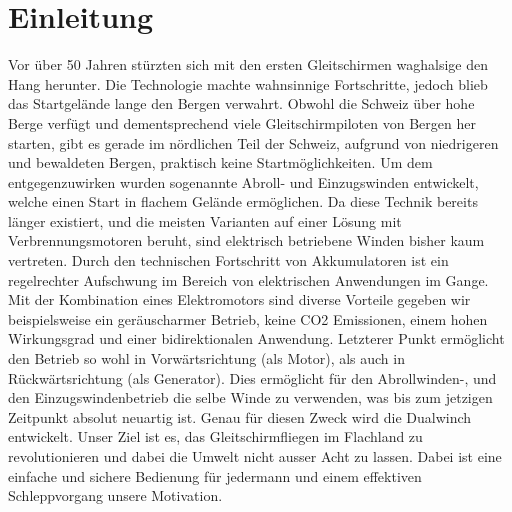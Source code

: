 \section{Einleitung}
Vor über 50 Jahren stürzten sich mit den ersten Gleitschirmen waghalsige den Hang herunter. Die Technologie machte wahnsinnige Fortschritte, jedoch blieb das Startgelände lange den Bergen verwahrt. Obwohl die Schweiz über hohe Berge verfügt und dementsprechend viele Gleitschirmpiloten von Bergen her starten, gibt es gerade im nördlichen Teil der Schweiz, aufgrund von niedrigeren und bewaldeten Bergen, praktisch keine Startmöglichkeiten. Um dem entgegenzuwirken wurden sogenannte Abroll- und Einzugswinden entwickelt, welche einen Start in flachem Gelände ermöglichen. Da diese Technik bereits länger existiert, und die meisten Varianten auf einer Lösung mit Verbrennungsmotoren beruht, sind elektrisch betriebene Winden bisher kaum vertreten. Durch den technischen Fortschritt von Akkumulatoren ist ein regelrechter Aufschwung im Bereich von elektrischen Anwendungen im Gange. Mit der Kombination eines Elektromotors sind diverse Vorteile gegeben wir beispielsweise ein geräuscharmer Betrieb, keine CO2 Emissionen, einem hohen Wirkungsgrad und einer bidirektionalen Anwendung. Letzterer Punkt ermöglicht den Betrieb so wohl in Vorwärtsrichtung (als Motor), als auch in Rückwärtsrichtung (als Generator). Dies ermöglicht für den Abrollwinden-, und den Einzugswindenbetrieb die selbe Winde zu verwenden, was bis zum jetzigen Zeitpunkt absolut neuartig ist. Genau für diesen Zweck wird die Dualwinch entwickelt. Unser Ziel ist es, das Gleitschirmfliegen im Flachland zu revolutionieren und dabei die Umwelt nicht ausser Acht zu lassen. Dabei ist eine einfache und sichere Bedienung für jedermann und einem effektiven Schleppvorgang unsere Motivation.

